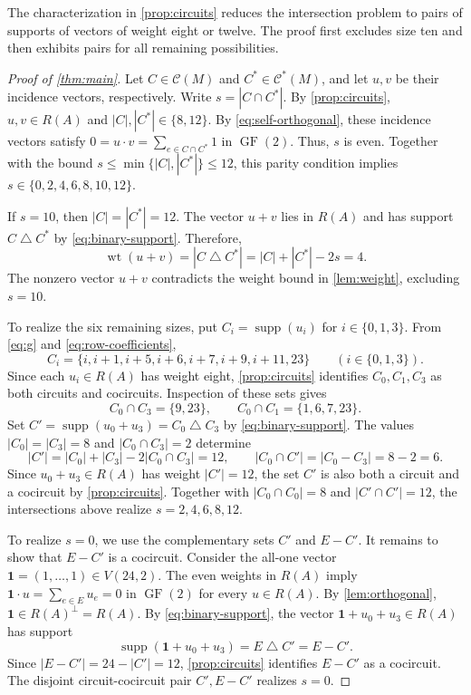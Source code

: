 \documentclass[11pt]{article}
\numberwithin{equation}{section}
\DeclareMathOperator{\GF}{GF}
\DeclareMathOperator{\supp}{supp}
\DeclareMathOperator{\wt}{wt}
\begin{document}
The characterization in \autoref{prop:circuits} reduces the intersection
problem to pairs of supports of vectors of weight eight or twelve. The proof first
excludes size ten and then exhibits pairs for all remaining possibilities.
\begin{proof}[Proof of \autoref{thm:main}]
Let $C\in\mathcal C(M)$ and $C^*\in\mathcal C^*(M)$, and let $u,v$ be
their incidence vectors, respectively. Write $s=|C\cap C^*|$.
By \autoref{prop:circuits}, $u,v\in R(A)$ and $|C|,|C^*|\in\{8,12\}$.
By \eqref{eq:self-orthogonal}, these incidence vectors satisfy
$0=u\cdot v=\sum_{e\in C\cap C^*}1$ in $\GF(2)$.
Thus, $s$ is even. Together with the bound
$s\leq\min\{|C|,|C^*|\}\leq12$, this parity condition implies
$s\in\{0,2,4,6,8,10,12\}$.

If $s=10$, then $|C|=|C^*|=12$.
The vector $u+v$ lies in $R(A)$ and has support $C\mathbin{\triangle}C^*$
by \eqref{eq:binary-support}. Therefore,
\[
 \wt(u+v)=|C\mathbin{\triangle}C^*|=|C|+|C^*|-2s=4.
\]
The nonzero vector $u+v$ contradicts the weight bound in
\autoref{lem:weight}, excluding $s=10$.

To realize the six remaining sizes, put $C_i=\supp(u_i)$ for
$i\in\{0,1,3\}$. From \eqref{eq:g} and \eqref{eq:row-coefficients},
\[
 C_i=\{i,i+1,i+5,i+6,i+7,i+9,i+11,23\}
 \qquad(i\in\{0,1,3\}).
\]
Since each $u_i\in R(A)$ has weight eight, \autoref{prop:circuits}
identifies $C_0,C_1,C_3$ as both circuits and cocircuits.
Inspection of these sets gives
\[
 C_0\cap C_3=\{9,23\},
 \qquad C_0\cap C_1=\{1,6,7,23\}.
\]
Set $C'=\supp(u_0+u_3)=C_0\mathbin{\triangle}C_3$ by
\eqref{eq:binary-support}. The values $|C_0|=|C_3|=8$ and
$|C_0\cap C_3|=2$ determine
\[
 |C'|=|C_0|+|C_3|-2|C_0\cap C_3|=12,
 \qquad |C_0\cap C'|=|C_0-C_3|=8-2=6.
\]
Since $u_0+u_3\in R(A)$ has weight $|C'|=12$, the set $C'$ is also both
a circuit and a cocircuit by \autoref{prop:circuits}.
Together with $|C_0\cap C_0|=8$
and $|C'\cap C'|=12$, the intersections above realize $s=2,4,6,8,12$.

To realize $s=0$, we use the complementary sets $C'$ and $E-C'$.
It remains to show that $E-C'$ is a cocircuit. Consider the all-one vector
$\mathbf1=(1,\ldots,1)\in V(24,2)$.
The even weights in $R(A)$ imply
$\mathbf1\cdot u=\sum_{e\in E}u_e=0$ in $\GF(2)$ for every $u\in R(A)$.
By \autoref{lem:orthogonal}, $\mathbf1\in R(A)^\perp=R(A)$.
By \eqref{eq:binary-support}, the vector $\mathbf1+u_0+u_3\in R(A)$
has support
\[
 \supp(\mathbf1+u_0+u_3)=E\mathbin{\triangle}C'=E-C'.
\]
Since $|E-C'|=24-|C'|=12$, \autoref{prop:circuits} identifies $E-C'$
as a cocircuit. The disjoint circuit-cocircuit pair $C',E-C'$ realizes $s=0$.
\end{proof}
\end{document}
